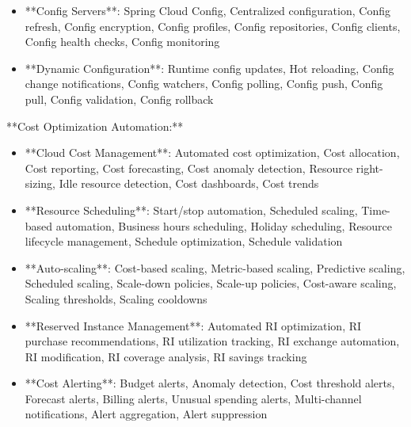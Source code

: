 \documentclass[11pt,a4paper]{article}
\begin{document}
\begin{itemize}
\item **Config Servers**: Spring Cloud Config, Centralized configuration, Config refresh, Config encryption, Config profiles, Config repositories, Config clients, Config health checks, Config monitoring
\end{itemize}

\begin{itemize}
\item **Dynamic Configuration**: Runtime config updates, Hot reloading, Config change notifications, Config watchers, Config polling, Config push, Config pull, Config validation, Config rollback
\end{itemize}

**Cost Optimization Automation:**

\begin{itemize}
\item **Cloud Cost Management**: Automated cost optimization, Cost allocation, Cost reporting, Cost forecasting, Cost anomaly detection, Resource right-sizing, Idle resource detection, Cost dashboards, Cost trends
\end{itemize}

\begin{itemize}
\item **Resource Scheduling**: Start/stop automation, Scheduled scaling, Time-based automation, Business hours scheduling, Holiday scheduling, Resource lifecycle management, Schedule optimization, Schedule validation
\end{itemize}

\begin{itemize}
\item **Auto-scaling**: Cost-based scaling, Metric-based scaling, Predictive scaling, Scheduled scaling, Scale-down policies, Scale-up policies, Cost-aware scaling, Scaling thresholds, Scaling cooldowns
\end{itemize}

\begin{itemize}
\item **Reserved Instance Management**: Automated RI optimization, RI purchase recommendations, RI utilization tracking, RI exchange automation, RI modification, RI coverage analysis, RI savings tracking
\end{itemize}

\begin{itemize}
\item **Cost Alerting**: Budget alerts, Anomaly detection, Cost threshold alerts, Forecast alerts, Billing alerts, Unusual spending alerts, Multi-channel notifications, Alert aggregation, Alert suppression
\end{itemize}
\end{document}
